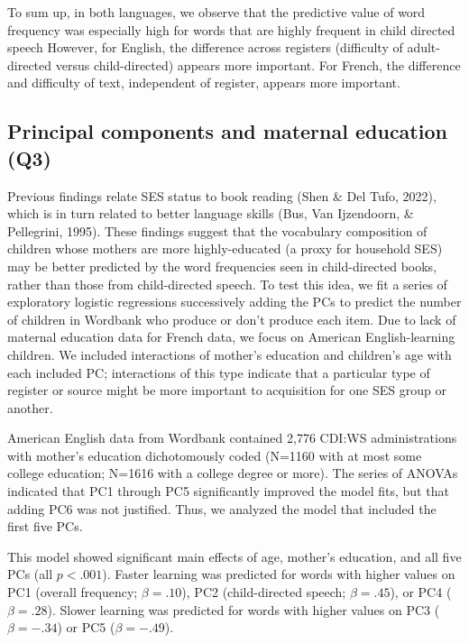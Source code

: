 \documentclass[10pt, letterpaper]{article}
\begin{document}
To sum up, in both languages, we observe that the predictive value of
word frequency was especially high for words that are highly frequent in
child directed speech However, for English, the difference across
registers (difficulty of adult-directed versus child-directed) appears
more important. For French, the difference and difficulty of text,
independent of register, appears more important.

\hypertarget{principal-components-and-maternal-education-q3}{%
\subsection{Principal components and maternal education
(Q3)}\label{principal-components-and-maternal-education-q3}}

Previous findings relate SES status to book reading (Shen \& Del Tufo,
2022), which is in turn related to better language skills (Bus, Van
Ijzendoorn, \& Pellegrini, 1995). These findings suggest that the
vocabulary composition of children whose mothers are more
highly-educated (a proxy for household SES) may be better predicted by
the word frequencies seen in child-directed books, rather than those
from child-directed speech. To test this idea, we fit a series of
exploratory logistic regressions successively adding the PCs to predict
the number of children in Wordbank who produce or don't produce each
item. Due to lack of maternal education data for French data, we focus
on American English-learning children. We included interactions of
mother's education and children's age with each included PC;
interactions of this type indicate that a particular type of register or
source might be more important to acquisition for one SES group or
another.

American English data from Wordbank contained 2,776 CDI:WS
administrations with mother's education dichotomously coded (N=1160 with
at most some college education; N=1616 with a college degree or more).
The series of ANOVAs indicated that PC1 through PC5 significantly
improved the model fits, but that adding PC6 was not justified. Thus, we
analyzed the model that included the first five PCs.

This model showed significant main effects of age, mother's education,
and all five PCs (all \(p<.001\)). Faster learning was predicted for
words with higher values on PC1 (overall frequency; \(\beta=.10\)), PC2
(child-directed speech; \(\beta=.45\)), or PC4 ( \(\beta=.28\)). Slower
learning was predicted for words with higher values on PC3
(\(\beta=-.34\)) or PC5 (\(\beta=-.49\)).
\end{document}
